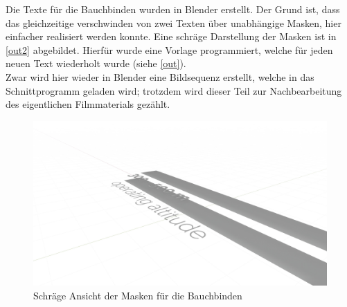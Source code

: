 Die Texte für die Bauchbinden wurden in Blender erstellt. Der Grund ist, dass das gleichzeitige verschwinden von zwei Texten über unabhängige Masken, hier einfacher realisiert werden konnte. Eine schräge Darstellung der Masken ist in \autoref{out2} abgebildet. Hierfür wurde eine Vorlage programmiert, welche für jeden neuen Text wiederholt wurde (siehe \autoref{out}).\\
Zwar wird hier wieder in Blender eine Bildsequenz erstellt, welche in das Schnittprogramm geladen wird; trotzdem wird dieser Teil zur Nachbearbeitung des eigentlichen Filmmaterials gezählt.

\begin{figure}[H]
\begin{center}
\includegraphics[width=\textwidth]{gfx/post/call-out2.jpg}
\caption{Schräge Ansicht der Masken für die Bauchbinden}
\label{out2}
\end{center}
\end{figure}

